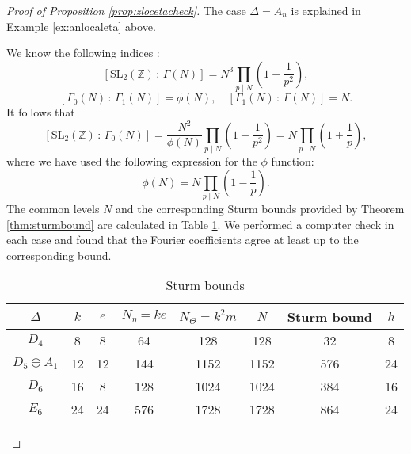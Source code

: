 \documentclass[11pt,a4paper]{amsart}
\theoremstyle{definition}
\newcommand{\SZ}{\mathbb{Z}}                    %
\newcommand{\SC}{\mathbb{C}}                    %
\begin{document}
\begin{proof}[{Proof of Proposition \ref{prop:zlocetacheck}}]
The case $\Delta=A_n$ is explained in Example \ref{ex:anlocaleta} above. 

We know the following indices \cite[Section 1.2]{diamond2005first}:
\[ [\mathrm{SL}_2(\SZ) \, : \, \Gamma(N) ]= N^3 \prod_{p \mid N}\left(1-\frac{1}{p^2} \right), \]
\[ [\Gamma_0(N) \, : \, \Gamma_1(N) ]= \phi(N), \quad [\Gamma_1(N) \, : \, \Gamma(N) ]= N. \]
It follows that
\[  [\mathrm{SL}_2(\SZ) \, : \, \Gamma_0(N) ]=\frac{N^2}{\phi(N)}\prod_{p \mid N}\left(1-\frac{1}{p^2} \right)=N\prod_{p \mid  N}\left(1+\frac{1}{p} \right), \]
where we have used the following expression for the $\phi$ function:
\[ \phi(N)=N \prod_{p \mid  N}\left(1-\frac{1}{p} \right). \]
The common levels $N$ and the corresponding Sturm bounds provided by Theorem \ref{thm:sturmbound} are calculated in Table \ref{table:sturm}. We performed a computer check in each case and found that the Fourier coefficients agree at least up to the corresponding bound.
\begin{table}
	\begin{tabular}{ |c|c|c|c|c|c|c|c| }
		\hline
		$\Delta$ & $k$ & $e$ & $N_{\eta}=ke$ & $N_{\Theta}=k^2m$ & $N$ & Sturm bound & $h$\\
		\hline
		$D_4$ & 8 & 8 & 64 & 128 & 128 & 32 & 8 \\
$D_5\oplus A_1$ & 12 & 12 & 144 & 1152 & 1152 & 576 & 24 \\
		$D_6$ & 16 & 8 & 128 & 1024 & 1024 & 384 & 16 \\
		$E_6$ & 24 & 24 & 576 & 1728 & 1728 & 864 & 24 \\
		\hline
	\end{tabular}
	\vspace{0.2in}
	\caption{Sturm bounds}
	\label{table:sturm}
\end{table}

\begin{comment}
Part (2): For $\Delta=D_n$, $n \geq 1$ the series $Z_{[\SC^2/G_\Delta]}(q)$ enumerates the Young walls of the corresponding type $D_n$ \cite{gyenge2015euler}.


\end{comment}
\end{proof}
\end{document}
